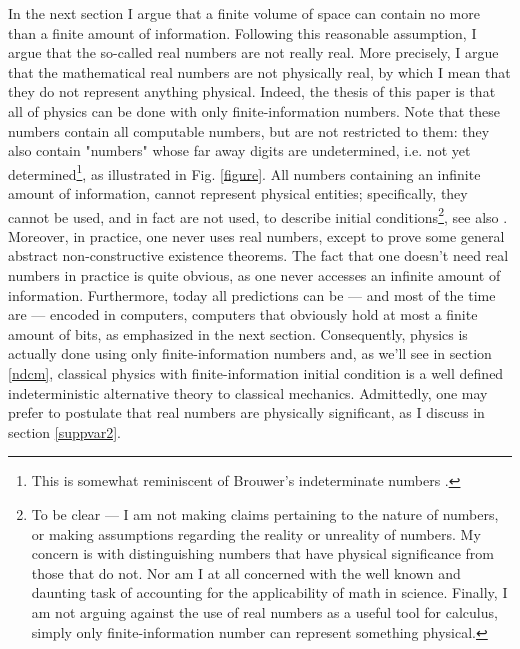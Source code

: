 \documentclass[floatfix,12pt]{article}
\begin{document}
In the next section I argue that a finite volume of space can contain no more than a finite amount of information. Following this reasonable assumption, I argue that the so-called real numbers are not really real. More precisely, I argue that the mathematical real numbers are not physically real, by which I mean that they do not represent anything physical. Indeed, the thesis of this paper is that all of physics can be done with only finite-information numbers. Note that these numbers contain all computable numbers, but are not restricted to them: they also contain "numbers" whose far away digits are undetermined, i.e. not yet determined\footnote{This is somewhat reminiscent of Brouwer's indeterminate numbers \cite{IndeterminateNumbersPosy}.}, as illustrated in Fig. \ref{figure}. All numbers containing an infinite amount of information, cannot represent physical entities; specifically, they cannot be used, and in fact are not used, to describe initial conditions\footnote{To be clear  --- I am not making claims pertaining to the nature of numbers, or making assumptions regarding the reality or unreality of numbers. My concern is with distinguishing numbers that have physical significance from those that do not. Nor am I at all concerned with the well known and daunting task of accounting for the applicability of math in science. Finally, I am not arguing against the use of real numbers as a useful tool for calculus, simply only finite-information number can represent something physical.}, see also \cite{DowekRealNb13}. Moreover, in practice, one never uses real numbers, except to prove some general abstract non-constructive existence theorems. The fact that one doesn't need real numbers in practice is quite obvious, as one never accesses an infinite amount of information. Furthermore, today all predictions can be --- and most of the time are --- encoded in computers, computers that obviously hold at most a finite amount of bits, as emphasized in the next section. Consequently, physics is actually done using only finite-information numbers and, as we'll see in section \ref{ndcm}, classical physics with finite-information initial condition is a well defined indeterministic alternative theory to classical mechanics. Admittedly, one may prefer to postulate that real numbers are physically significant, as I discuss in section \ref{suppvar2}.
\end{document}

